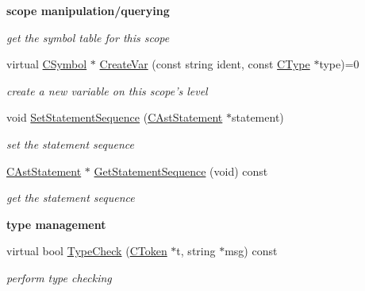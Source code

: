 \begin{Indent}{\bf scope manipulation/querying}
\begin{DoxyCompactItemize}
\begin{DoxyCompactList}\small\item\em get the symbol table for this scope \end{DoxyCompactList}\item 
\hypertarget{classCAstScope_a21fdf358d87cd2b7cb474f1b2b8528ed}{virtual \hyperlink{classCSymbol}{C\-Symbol} $\ast$ \hyperlink{classCAstScope_a21fdf358d87cd2b7cb474f1b2b8528ed}{Create\-Var} (const string ident, const \hyperlink{classCType}{C\-Type} $\ast$type)=0}\label{classCAstScope_a21fdf358d87cd2b7cb474f1b2b8528ed}

\begin{DoxyCompactList}\small\item\em create a new variable on this scope's level \end{DoxyCompactList}\item 
\hypertarget{classCAstScope_a607f07bb3f287e24a52ec94fc124db47}{void \hyperlink{classCAstScope_a607f07bb3f287e24a52ec94fc124db47}{Set\-Statement\-Sequence} (\hyperlink{classCAstStatement}{C\-Ast\-Statement} $\ast$statement)}\label{classCAstScope_a607f07bb3f287e24a52ec94fc124db47}

\begin{DoxyCompactList}\small\item\em set the statement sequence \end{DoxyCompactList}\item 
\hypertarget{classCAstScope_a08fc89e784df9bb3de067b3d50d07661}{\hyperlink{classCAstStatement}{C\-Ast\-Statement} $\ast$ \hyperlink{classCAstScope_a08fc89e784df9bb3de067b3d50d07661}{Get\-Statement\-Sequence} (void) const }\label{classCAstScope_a08fc89e784df9bb3de067b3d50d07661}

\begin{DoxyCompactList}\small\item\em get the statement sequence \end{DoxyCompactList}\end{DoxyCompactItemize}
\end{Indent}
\begin{Indent}{\bf type management}\par
\begin{DoxyCompactItemize}
\item 
virtual bool \hyperlink{classCAstScope_a36bbb82239591878b9f1701abee3eeeb}{Type\-Check} (\hyperlink{classCToken}{C\-Token} $\ast$t, string $\ast$msg) const 
\begin{DoxyCompactList}\small\item\em perform type checking \end{DoxyCompactList}\end{DoxyCompactItemize}
\end{Indent}
